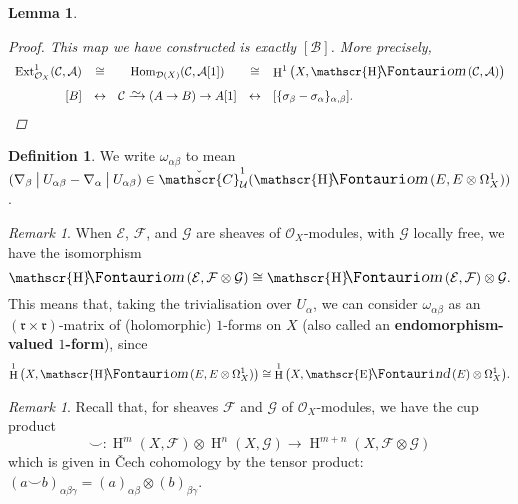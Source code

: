 \documentclass[11pt,fleqn]{article}
\theoremstyle{plain}
\newtheorem{lemma}[theorem]{Lemma}
\theoremstyle{definition}
\newtheorem{definition}[theorem]{Definition}
\theoremstyle{remark}
\newtheorem{remark}[theorem]{Remark}
\numberwithin{equation}{theorem}
\newcommand{\cover}{\mathcal{U}}
\newcommand{\OO}{\mathcal{O}}
\newcommand{\restricted}{\mathbin{\big\vert}}
\newcommand{\congto}{\xrightarrow{\raisebox{-.5ex}[0ex][0ex]{$\sim$}}}
\newcommand{\cech}{\check{\mathscr{C}}}
\newcommand{\define}[1]{\textbf{#1}}
\DeclareMathOperator{\Hom}{Hom}
\DeclareMathOperator{\HH}{H}
\DeclareMathOperator{\sheafhom}{\mathscr{H}\textup{\kern -2.5pt {\large\Fontauri\slshape om}}\,}
\DeclareMathOperator{\sheafend}{\mathscr{E}\textup{\kern -2pt {\large\Fontauri\slshape nd}}\,}
\DeclareMathOperator{\Ext}{Ext}
\begin{document}
\begin{lemma}
\begin{proof}
                This map we have constructed is exactly $[\mathcal{B}]$.
                More precisely,
                \begin{equation*}
                    \begin{array}{rcccl}
                        \Ext_{\OO_X}^1(\mathcal{C},\mathcal{A}) &\cong& \Hom_{\mathcal{D}(X)}(\mathcal{C},\mathcal{A}[1]) &\cong& \HH^1\big(X,\sheafhom(\mathcal{C},\mathcal{A})\big)\\[.8em]
                        {[B]} &\leftrightarrow& \mathcal{C}\congto(A\to B)\to A[1] &\leftrightarrow& [\{\sigma_\beta-\sigma_\alpha\}_{\alpha,\beta}].
                    \end{array}
                \end{equation*}
            \end{proof}
        \end{lemma}

        \begin{definition}\label{definition:omega-alpha-beta}
            We write $\omega_{\alpha\beta}$ to mean $(\nabla_\beta \restricted U_{\alpha\beta} - \nabla_\alpha \restricted U_{\alpha\beta})\in\cech_\cover^1(\sheafhom(E,E\otimes\Omega_X^1))$.
        \end{definition}

        \begin{remark}
            When $\mathcal{E}$, $\mathcal{F}$, and $\mathcal{G}$ are sheaves of $\OO_X$-modules, with $\mathcal{G}$ locally free, we have the isomorphism
            \begin{equation*}
                \sheafhom(\mathcal{E},\mathcal{F}\otimes\mathcal{G}) \cong \sheafhom(\mathcal{E},\mathcal{F})\otimes\mathcal{G}.
            \end{equation*}
            This means that, taking the trivialisation over $U_\alpha$, we can consider $\omega_{\alpha\beta}$ as an $(\mathfrak{r}\times\mathfrak{r})$-matrix of (holomorphic) $1$-forms on $X$ (also called an \define{endomorphism-valued $1$-form}), since
            \begin{equation*}
                \HH^1\big(X,\sheafhom(E,E\otimes\Omega_X^1)\big) \cong \HH^1\big(X,\sheafend(E)\otimes\Omega_X^1\big).
            \end{equation*}
        \end{remark}

        \begin{remark}\label{remark:cup-product-cech}
            Recall that, for sheaves $\mathscr{F}$ and $\mathscr{G}$ of $\OO_X$-modules, we have the cup product
            \begin{equation*}
                \smile \colon \HH^m(X,\mathscr{F})\otimes\HH^n(X,\mathscr{G}) \to \HH^{m+n}(X,\mathscr{F}\otimes\mathscr{G})
            \end{equation*}
            which is given in Čech cohomology by the tensor product: $(a\smile b)_{\alpha\beta\gamma} = (a)_{\alpha\beta}\otimes(b)_{\beta\gamma}$.
        \end{remark}
\end{document}
